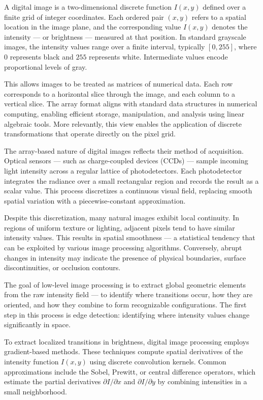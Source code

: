 A digital image is a two-dimensional discrete function $I(x, y)$ defined over a finite grid of integer coordinates. Each ordered pair $(x, y)$ refers to a spatial location in the image plane, and the corresponding value $I(x, y)$ denotes the intensity — or brightness — measured at that position. In standard grayscale images, the intensity values range over a finite interval, typically $[0, 255]$, where $0$ represents black and $255$ represents white. Intermediate values encode proportional levels of gray.

This allows images to be treated as matrices of numerical data. Each row corresponds to a horizontal slice through the image, and each column to a vertical slice. The array format aligns with standard data structures in numerical computing, enabling efficient storage, manipulation, and analysis using linear algebraic tools. More relevantly, this view enables the application of discrete transformations that operate directly on the pixel grid.

The array-based nature of digital images reflects their method of acquisition. Optical sensors — such as charge-coupled devices (CCDs) — sample incoming light intensity across a regular lattice of photodetectors. Each photodetector integrates the radiance over a small rectangular region and records the result as a scalar value. This process discretizes a continuous visual field, replacing smooth spatial variation with a piecewise-constant approximation.

Despite this discretization, many natural images exhibit local continuity. In regions of uniform texture or lighting, adjacent pixels tend to have similar intensity values. This results in spatial smoothness — a statistical tendency that can be exploited by various image processing algorithms. Conversely, abrupt changes in intensity may indicate the presence of physical boundaries, surface discontinuities, or occlusion contours.

The goal of low-level image processing is to extract global geometric elements from the raw intensity field — to identify where transitions occur, how they are oriented, and how they combine to form recognizable configurations. The first step in this process is edge detection: identifying where intensity values change significantly in space.

To extract localized transitions in brightness, digital image processing employs gradient-based methods. These techniques compute spatial derivatives of the intensity function $I(x, y)$ using discrete convolution kernels. Common approximations include the Sobel, Prewitt, or central difference operators, which estimate the partial derivatives $\partial I / \partial x$ and $\partial I / \partial y$ by combining intensities in a small neighborhood.

